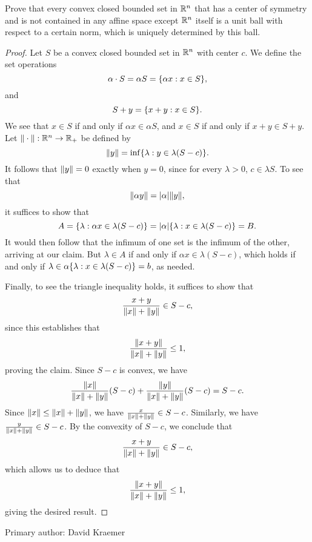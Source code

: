 \begin{minorEx}
    Prove that every convex closed bounded set in $\mathbb{R}^n$ that has a center of
    symmetry and is not contained in any affine space except $\mathbb{R}^n$ itself is a
    unit ball with respect to a certain norm, which is uniquely determined by
    this ball.
\end{minorEx}

\begin{proof}
    Let $S$ be a convex closed bounded set in $\mathbb{R}^n$ with center $c$. We define
    the set operations
    \[
        \alpha \cdot S = \alpha S = \{\alpha x : x \in S\},
    \]
    and
    \[
        S + y = \{x + y : x \in S\}.
    \]
    We see that $x \in S$ if and only if $\alpha x \in \alpha S$, and $x \in S$
    if and only if $x + y \in S + y$. Let $\Vert\cdot\Vert : \mathbb{R}^n
    \to \mathbb{R}_{+}$ be defined by
    \[
        \Vert y\Vert = \inf \{\lambda : y \in \lambda (S - c)\}.
    \]
    It follows that $\Vert y\Vert = 0$ exactly when $y = 0$, since for every
    $\lambda > 0$, $c \in \lambda S$. To see that
    \[
        \Vert\alpha y\Vert = |\alpha| \Vert y\Vert,
    \]
    it suffices to show that 
    \[
        A = \{\lambda : \alpha x \in \lambda (S - c)\} =
        |\alpha| \{\lambda : x \in \lambda (S - c)\} = B.
    \]
    It would then follow that the infimum of one set is the infimum of the
    other, arriving at our claim. But $\lambda \in A$ if and only if $\alpha x \in
    \lambda(S - c)$, which holds if and only if $\lambda \in \alpha \{\lambda
        : x \in \lambda (S - c)\} = b$, as needed.

    Finally, to see the triangle inequality holds, it suffices to show that 
    \[
        \frac{x + y}{\Vert x\Vert + \Vert y\Vert} \in S - c,
    \]
    since this establishes that
    \[
        \frac{\Vert x + y\Vert}{\Vert x\Vert + \Vert y\Vert} \leq 1,
    \]
    proving the claim. Since $S-c$ is convex, we have
    \[
        \frac{\Vert x\Vert}{\Vert x\Vert + \Vert y\Vert} (S - c) + 
        \frac{\Vert y\Vert}{\Vert x\Vert + \Vert y\Vert} (S - c) = 
        S - c.
    \]
    Since $\Vert x\Vert \leq \Vert x\Vert + \Vert y\Vert$, we have $\frac{x}{\Vert x\Vert +
    \Vert y\Vert} \in S - c$. Similarly, we have $\frac{y}{\Vert x\Vert + \Vert y\Vert} \in
    S - c$. By the convexity of $S - c$, we conclude that 
    \[
        \frac{x + y}{\Vert x\Vert + \Vert y\Vert} \in S - c,
    \]
    which allows us to deduce that
    \[
        \frac{\Vert x + y\Vert}{\Vert x\Vert + \Vert y\Vert} \leq 1,
    \]
    giving the desired result.
\end{proof}

Primary author: David Kraemer
